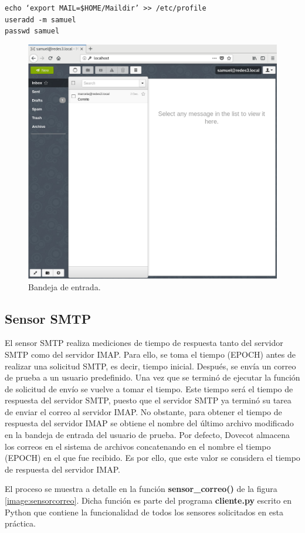 \texttt{echo `export MAIL=\$HOME/Maildir' >{}>  /etc/profile}\\
\texttt{useradd -m samuel}\\
\texttt{passwd samuel}

\FloatBarrier
\begin{figure}[htbp!]
		\centering
			\includegraphics[width=.65 \textwidth]{images/mail}
		\caption{Bandeja de entrada.}
		\label{image:mail}
\end{figure}
\FloatBarrier

\subsection{Sensor SMTP}
El sensor SMTP realiza mediciones de tiempo de respuesta tanto del servidor SMTP como del servidor IMAP. Para ello, se toma el tiempo (EPOCH) antes de realizar una solicitud SMTP, es decir, tiempo inicial. Después, se envía un correo de prueba a un usuario predefinido. Una vez que se terminó de ejecutar la función de solicitud de envío se vuelve a tomar el tiempo. Este tiempo será el tiempo de respuesta del servidor SMTP, puesto que el servidor SMTP ya terminó su tarea de enviar el correo al servidor IMAP. No obstante, para obtener el tiempo de respuesta del servidor IMAP se obtiene el nombre del último archivo modificado en la bandeja de entrada del usuario de prueba. Por defecto, Dovecot almacena los correos en el sistema de archivos concatenando en el nombre el tiempo (EPOCH) en el que fue recibido. Es por ello, que este valor se considera el tiempo de respuesta del servidor IMAP.

El proceso se muestra a detalle en la función \textbf{sensor\_correo()} de la figura \ref{image:sensorcorreo}. Dicha función es parte del programa \textbf{cliente.py} escrito en Python que contiene la funcionalidad de todos los sensores solicitados en esta práctica.

